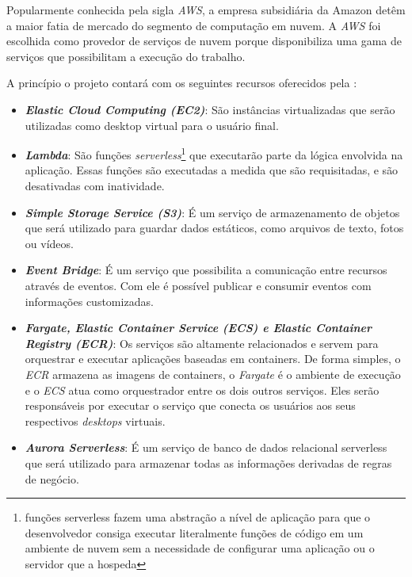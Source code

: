 Popularmente conhecida pela sigla \textit{AWS}, a empresa subsidiária da Amazon detêm a maior fatia de mercado do segmento de computação em nuvem. A \textit{AWS} foi escolhida como provedor de serviços de nuvem porque disponibiliza uma gama de serviços que possibilitam a execução do trabalho.

A princípio o projeto contará com os seguintes recursos oferecidos pela \citet{awsconceitosbasicos}: 

\begin{itemize}

    \item \textbf{\textit{Elastic Cloud Computing (EC2)}}: São instâncias virtualizadas que serão utilizadas como desktop virtual para o usuário final.
    
    \item \textbf{\textit{Lambda}}: São funções \textit{serverless}\footnote{funções serverless fazem uma abstração a nível de aplicação para que o desenvolvedor consiga executar literalmente funções de código em um ambiente de nuvem sem a necessidade de configurar uma aplicação ou o servidor que a hospeda} que executarão parte da lógica envolvida na aplicação. Essas funções são executadas a medida que são requisitadas, e são desativadas com inatividade.
    
    \item \textbf{\textit{Simple Storage Service (S3)}}: É um serviço de armazenamento de objetos que será utilizado para guardar dados estáticos, como arquivos de texto, fotos ou vídeos.
    
    \item \textbf{\textit{Event Bridge}}: É um serviço que possibilita a comunicação entre recursos através de eventos. Com ele é possível publicar e consumir eventos com informações customizadas.
    
    \item \textbf{\textit{Fargate, Elastic Container Service (ECS) e Elastic Container Registry (ECR)}}: Os serviços são altamente relacionados e servem para orquestrar e executar aplicações baseadas em containers. De forma simples, o \textit{ECR} armazena as imagens de containers, o \textit{Fargate} é o ambiente de execução e o \textit{ECS} atua como orquestrador entre os dois outros serviços. Eles serão responsáveis por executar o serviço que conecta os usuários aos seus respectivos \textit{desktops} virtuais.
    
    \item \textbf{\textit{Aurora Serverless}}: É um serviço de banco de dados relacional serverless que será utilizado para armazenar todas as informações derivadas de regras de negócio.


\end{itemize}
